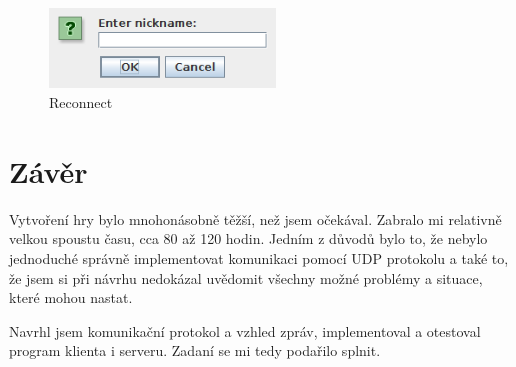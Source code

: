 \documentclass[12pt, a4paper]{article}
\begin{document}
	\begin{figure}[ht!]
		\centering
		\caption{Reconnect}
		\label{Reconnect}
		\includegraphics[width=6cm]{img/Reconnect.png}
	\end{figure}
	
	\section{Závěr}
	Vytvoření hry bylo mnohonásobně těžší, než jsem očekával. Zabralo mi relativně velkou spoustu času, cca 80 až 120 hodin. Jedním z důvodů bylo to, že nebylo jednoduché správně implementovat komunikaci pomocí UDP protokolu a také to, že jsem si při návrhu nedokázal uvědomit všechny možné problémy a situace, které mohou nastat.
	
	Navrhl jsem komunikační protokol a vzhled zpráv, implementoval a otestoval program klienta i serveru. Zadaní se mi tedy podařilo splnit.
	
\end{document}
